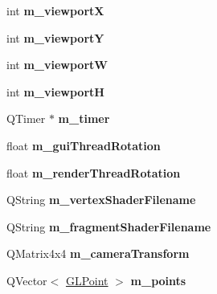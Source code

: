 \begin{DoxyCompactItemize}
\item 
\mbox{\label{class_g_l_item_a6f01d6d9f59a2c151ba7ceef071b1689}} 
int {\bfseries m\+\_\+viewportX}
\item 
\mbox{\label{class_g_l_item_ae80eb4ae45d65460db5535598b54a873}} 
int {\bfseries m\+\_\+viewportY}
\item 
\mbox{\label{class_g_l_item_a7941d53165e82da781e98f1523d1189c}} 
int {\bfseries m\+\_\+viewportW}
\item 
\mbox{\label{class_g_l_item_a7b4451d24045e056aed2e395174714e0}} 
int {\bfseries m\+\_\+viewportH}
\item 
\mbox{\label{class_g_l_item_a6c60908bebbb5d5089f363b425d9a744}} 
Q\+Timer $\ast$ {\bfseries m\+\_\+timer}
\item 
\mbox{\label{class_g_l_item_af234a9a0d980c8e96fe04cc35c96e9df}} 
float {\bfseries m\+\_\+gui\+Thread\+Rotation}
\item 
\mbox{\label{class_g_l_item_a323a6e917ca9e27991ac1837efc96a3f}} 
float {\bfseries m\+\_\+render\+Thread\+Rotation}
\item 
\mbox{\label{class_g_l_item_a669c6b22f83bc2d6739e80a8870eab57}} 
Q\+String {\bfseries m\+\_\+vertex\+Shader\+Filename}
\item 
\mbox{\label{class_g_l_item_ae589369bc5ec1439f67144f128b34405}} 
Q\+String {\bfseries m\+\_\+fragment\+Shader\+Filename}
\item 
\mbox{\label{class_g_l_item_acc7f15d8aa73d0e9f9bd4397b7f7d377}} 
Q\+Matrix4x4 {\bfseries m\+\_\+camera\+Transform}
\item 
\mbox{\label{class_g_l_item_a52bdba33d8c29f43ed5506035fbcaa81}} 
Q\+Vector$<$ \mbox{\hyperlink{class_g_l_point}{G\+L\+Point}} $>$ {\bfseries m\+\_\+points}
\item 
\mbox{\label{class_g_l_item_a8468276169e38c20e55eaf390a8e81c1}} 

\end{DoxyCompactItemize}
